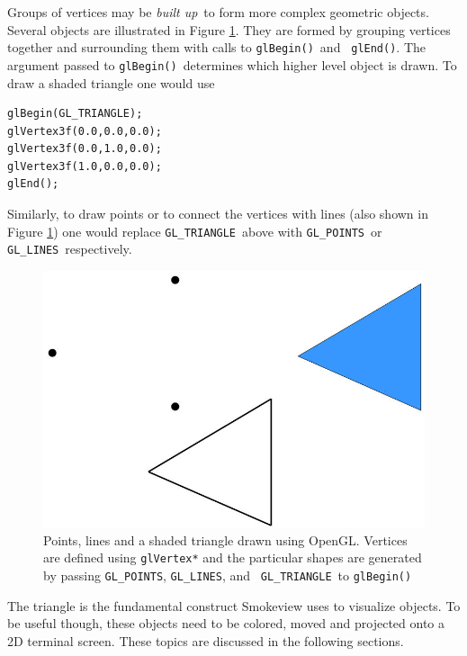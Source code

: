 \documentclass[11pt,twoside]{book}
\newcommand{\figoptions}{htp}
\begin{document}
Groups of vertices may be {\em built up}\ to form more complex geometric objects.
Several objects are illustrated in Figure \ref{figshapes}.  They are formed by grouping vertices together
and surrounding them with calls to {\tt glBegin()}\ and {\tt
glEnd()}. The argument passed to {\tt glBegin()}\ determines which higher level object is drawn.
To draw a shaded triangle one would use
\begin{verbatim}
glBegin(GL_TRIANGLE);
glVertex3f(0.0,0.0,0.0);
glVertex3f(0.0,1.0,0.0);
glVertex3f(1.0,0.0,0.0);
glEnd();
\end{verbatim}
Similarly, to draw points or to connect the vertices with lines (also shown
in Figure \ref{figshapes}) one would replace {\tt GL\_TRIANGLE}\ above
with {\tt GL\_POINTS}\ or {\tt GL\_LINES}\ respectively.
\begin{figure}[\figoptions]
\begin{center}
\includegraphics[width=6.0in]{FIGURES/shapes}
\end{center}
\caption[Points, lines and a shaded triangle drawn using OpenGL.]
{Points, lines and a shaded triangle drawn using OpenGL. Vertices
are defined using {\tt glVertex*} and the particular shapes are
generated by passing {\tt GL\_POINTS}, {\tt GL\_LINES}, and {\tt
GL\_TRIANGLE}\ to {\tt glBegin()} } \label{figshapes}
\end{figure}

The triangle is the fundamental construct Smokeview uses to
visualize objects.  To be useful though, these objects need to be
colored, moved and projected onto a 2D terminal screen. These
topics are discussed in the following sections.

%
%
\end{document}

